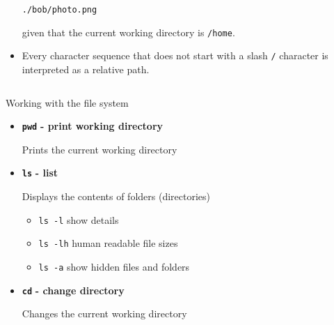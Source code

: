\documentclass[aspectratio=1610]{beamer}
\newcommand\curtitle{}
\newcommand\command[1]{\alert{\textbf{\texttt{#1}}}}
\begin{document}
\begin{frame}[c]{\curtitle}
\begin{adjustwidth}{-2em}{-2em}
\begin{columns}
\begin{column}{0.70\textwidth}
\begin{itemize}[<+->]
                        \medskip\texttt{./bob/photo.png}

                        \medskip given that the current working directory is \texttt{/home}.
                    \item Every character sequence that does not start with a slash \alert{\texttt{/}} character
                        is interpreted as a relative path.
                \end{itemize}
            \end{column}
        \end{columns}
    \end{adjustwidth}
\end{frame}

\renewcommand\curtitle{Working with the file system}


\begin{frame}[c]{\curtitle}
    \begin{itemize}[<+->]
        \setlength\itemsep{1em}
        \item \command{pwd} \textbf{- print working directory} 

            Prints the current working directory
        \item \command{ls} \textbf{- list} 

            Displays the contents of folders (directories)
            \begin{itemize}[<.->]
                \item \alert{\texttt{ls -l}} show details
                \item \alert{\texttt{ls -lh}} human readable file sizes
                \item \alert{\texttt{ls -a}} show hidden files and folders
            \end{itemize}
        \item \command{cd} \textbf{- change directory} 

            Changes the current working directory
    \end{itemize}
\end{frame}

\end{document}
